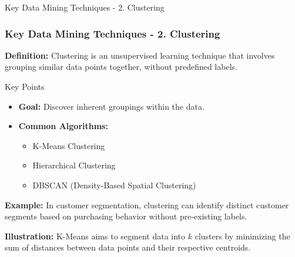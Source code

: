 \documentclass[aspectratio=169]{beamer}
\begin{document}
\begin{frame}[fragile]{Key Data Mining Techniques - 2. Clustering}
    \frametitle{Key Data Mining Techniques - 2. Clustering}
    
    \textbf{Definition:} Clustering is an unsupervised learning technique that involves grouping similar data points together, without predefined labels.

    \begin{block}{Key Points}
        \begin{itemize}
            \item \textbf{Goal:} Discover inherent groupings within the data.
            \item \textbf{Common Algorithms:}
                \begin{itemize}
                    \item K-Means Clustering
                    \item Hierarchical Clustering
                    \item DBSCAN (Density-Based Spatial Clustering)
                \end{itemize}
        \end{itemize}
    \end{block}
    
    \textbf{Example:} 
    In customer segmentation, clustering can identify distinct customer segments based on purchasing behavior without pre-existing labels.
    
    \smallskip
    \textbf{Illustration:} K-Means aims to segment data into \(k\) clusters by minimizing the sum of distances between data points and their respective centroids.
\end{frame}
\end{document}
